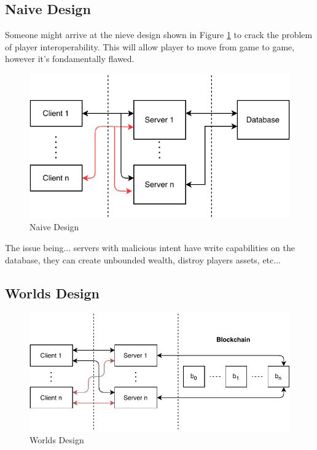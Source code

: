 \documentclass[runningheads,a4paper]{llncs}
\begin{document}
\subsection{Naive Design}
Someone might arrive at the nieve design shown in Figure \ref{naive} to crack
the problem of player interoperability. This will allow player to move from game
to game, however it's fondamentally flawed.

\begin{figure}[H]
\centering
\includegraphics[scale=1]{img/nieve.pdf}
\caption{Naive Design}
\label{naive} 
\end{figure}

The issue being... servers with malicious intent have write capabilities on the
database, they can create unbounded wealth, distroy players assets, etc...

\subsection{Worlds Design}

\begin{figure}[H]
\centering
\includegraphics[scale=1]{img/worlds.pdf}
\caption{Worlds Design}
\label{fig:Worlds}
\end{figure}
\end{document}

